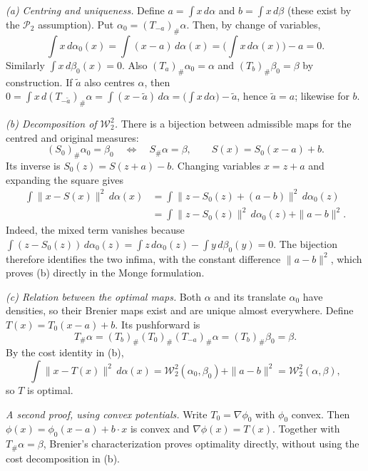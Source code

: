 \documentclass[11pt,a4paper]{article}
\theoremstyle{exostyle}
\newcommand{\push}{\#}
\newcommand{\Wtwo}{\mathcal{W}_2}
\begin{document}
\begin{solution}
\emph{(a) Centring and uniqueness.}
Define $a=\int x\,d\alpha$ and $b=\int x\,d\beta$ (these exist by the $\mathcal P_2$ assumption). Put $\alpha_0=(T_{-a})_{\push}\alpha$. Then, by change of variables,
\[
\int x\,d\alpha_0(x)=\int (x-a)\,d\alpha(x)=\Big(\int x\,d\alpha(x)\Big)-a=0.
\]
Similarly $\int x\,d\beta_0(x)=0$. Also $(T_a)_{\push}\alpha_0=\alpha$ and $(T_b)_{\push}\beta_0=\beta$ by construction. If $\tilde a$ also centres $\alpha$, then $0=\int x\,d(T_{-\tilde a})_{\push}\alpha=\int (x-\tilde a)\,d\alpha=\big(\int x\,d\alpha\big)-\tilde a$, hence $\tilde a=a$; likewise for $b$.

\emph{(b) Decomposition of $\Wtwo^2$.}
There is a bijection between admissible maps for the centred and original measures:
\[
(S_0)_{\push}\alpha_0=\beta_0
\quad\Longleftrightarrow\quad
S_{\push}\alpha=\beta,
\qquad S(x)=S_0(x-a)+b.
\]
Its inverse is $S_0(z)=S(z+a)-b$. Changing variables $x=z+a$ and expanding the square gives
\begin{align*}
\int\|x-S(x)\|^2\,d\alpha(x)
&=\int\|z-S_0(z)+(a-b)\|^2\,d\alpha_0(z)\\
&=\int\|z-S_0(z)\|^2\,d\alpha_0(z)+\|a-b\|^2.
\end{align*}
Indeed, the mixed term vanishes because
$\int(z-S_0(z))\,d\alpha_0(z)=\int z\,d\alpha_0(z)-\int y\,d\beta_0(y)=0$.
The bijection therefore identifies the two infima, with the constant difference $\|a-b\|^2$, which proves (b) directly in the Monge formulation.

\emph{(c) Relation between the optimal maps.}
Both $\alpha$ and its translate $\alpha_0$ have densities, so their Brenier maps exist and are unique almost everywhere. Define $T(x)=T_0(x-a)+b$. Its pushforward is
\[
T_{\push}\alpha=(T_b)_{\push}(T_0)_{\push}(T_{-a})_{\push}\alpha
=(T_b)_{\push}\beta_0=\beta.
\]
By the cost identity in (b),
\[
\int\|x-T(x)\|^2\,d\alpha(x)
=\Wtwo^2(\alpha_0,\beta_0)+\|a-b\|^2=\Wtwo^2(\alpha,\beta),
\]
so $T$ is optimal.

\emph{A second proof, using convex potentials.}
Write $T_0=\nabla\phi_0$ with $\phi_0$ convex. Then
$\phi(x)=\phi_0(x-a)+b\cdot x$ is convex and $\nabla\phi(x)=T(x)$.
Together with $T_{\push}\alpha=\beta$, Brenier's characterization proves optimality directly, without using the cost decomposition in (b).
\end{solution}
\end{document}
